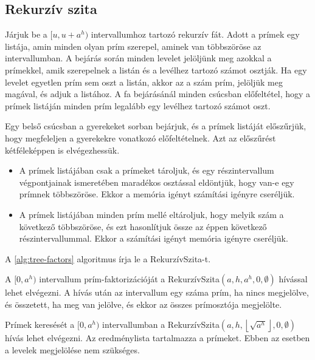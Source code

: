 \documentclass[12pt]{report}
\begin{document}
\pagebreak

\subsection{Rekurzív szita}

Járjuk be a $[u, u+a^h)$ intervallumhoz tartozó rekurzív fát.
Adott a prímek egy listája, amin minden olyan prím szerepel,
aminek van többszöröse az intervallumban.
A bejárás során minden levelet jelöljünk meg azokkal a prímekkel,
amik szerepelnek a listán és a levélhez tartozó számot osztják.
Ha egy levelet egyetlen prím sem oszt a listán,
akkor az a szám prím, jelöljük meg magával,
és adjuk a listához.
A fa bejárásánál minden csúcsban előfeltétel,
hogy a prímek listáján minden prím legalább egy levélhez tartozó számot oszt.

Egy belső csúcsban a gyerekeket sorban bejárjuk,
és a prímek listáját előszűrjük, hogy megfeleljen a gyerekekre vonatkozó előfeltételnek.
Azt az előszűrést kétféleképpen is elvégezhessük.
\begin{itemize}
\item A prímek listájában csak a prímeket tároljuk,
és egy részintervallum végpontjainak ismeretében maradékos osztással eldöntjük,
hogy van-e egy prímnek többszöröse.
Ekkor a memória igényt számítási igényre cseréljük.
\item A prímek listájában minden prím mellé eltároljuk,
hogy melyik szám a következő többszöröse,
és ezt hasonlítjuk össze az éppen következő részintervallummal.
Ekkor a számítási igényt memória igényre cseréljük.
\end{itemize}

A \ref{alg:tree-factors} algoritmus írja le a RekurzívSzita-t.

A $[0, a^h)$ intervallum prím-faktorizációját a
RekurzívSzita$(a, h, a^h, 0, \emptyset)$
hívással lehet elvégezni.
A hívás után az intervallum egy száma prím, ha nincs megjelölve,
és összetett, ha meg van jelölve, és ekkor az összes prímosztója megjelölte.

Prímek keresését a $[0, a^h)$ intervallumban a
RekurzívSzita$(a, h, \left\lfloor \sqrt{a^h} \right\rfloor, 0, \emptyset)$
hívás lehet elvégezni.
Az eredménylista tartalmazza a prímeket.
Ebben az esetben a levelek megjelölése nem szükséges.
\end{document}
